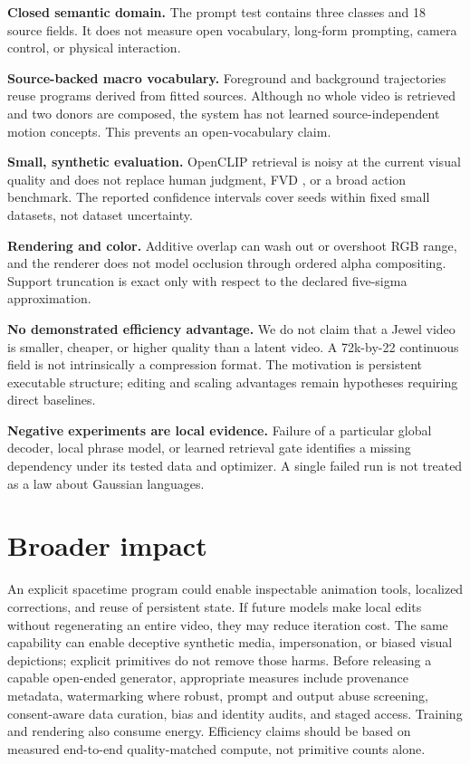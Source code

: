 \documentclass{article}
\begin{document}
\textbf{Closed semantic domain.} The prompt test contains three classes and 18 source fields. It
does not measure open vocabulary, long-form prompting, camera control, or physical interaction.

\textbf{Source-backed macro vocabulary.} Foreground and background trajectories reuse programs
derived from fitted sources. Although no whole video is retrieved and two donors are composed, the
system has not learned source-independent motion concepts. This prevents an open-vocabulary claim.

\textbf{Small, synthetic evaluation.} OpenCLIP retrieval is noisy at the current visual quality and
does not replace human judgment, FVD \cite{unterthiner2018fvd}, or a broad action benchmark. The
reported confidence intervals cover seeds within fixed small datasets, not dataset uncertainty.

\textbf{Rendering and color.} Additive overlap can wash out or overshoot RGB range, and the renderer
does not model occlusion through ordered alpha compositing. Support truncation is exact only with
respect to the declared five-sigma approximation.

\textbf{No demonstrated efficiency advantage.} We do not claim that a Jewel video is smaller,
cheaper, or higher quality than a latent video. A 72k-by-22 continuous field is not intrinsically a
compression format. The motivation is persistent executable structure; editing and scaling
advantages remain hypotheses requiring direct baselines.

\textbf{Negative experiments are local evidence.} Failure of a particular global decoder, local
phrase model, or learned retrieval gate identifies a missing dependency under its tested data and
optimizer. A single failed run is not treated as a law about Gaussian languages.

\section{Broader impact}
\label{sec:impact}

An explicit spacetime program could enable inspectable animation tools, localized corrections, and
reuse of persistent state. If future models make local edits without regenerating an entire video,
they may reduce iteration cost. The same capability can enable deceptive synthetic media,
impersonation, or biased visual depictions; explicit primitives do not remove those harms. Before
releasing a capable open-ended generator, appropriate measures include provenance metadata,
watermarking where robust, prompt and output abuse screening, consent-aware data curation, bias and
identity audits, and staged access. Training and rendering also consume energy. Efficiency claims
should be based on measured end-to-end quality-matched compute, not primitive counts alone.
\end{document}
